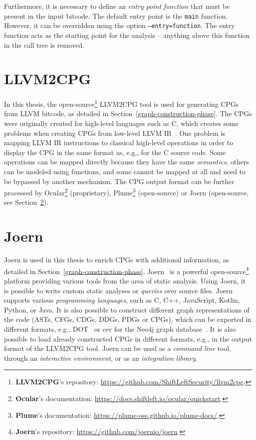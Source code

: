 Furthermore, it is necessary to define an \textit{entry point function} that must be present in the input bitcode. The default entry point is the \texttt{main} function. However, it can be overridden using the option \texttt{--entry=function}. The entry function acts as the starting point for the analysis -- anything above this function in the call tree is removed.


\section{LLVM2CPG}
\label{llvm2cpg}
In this thesis, the open-source\footnote{\textbf{LLVM2CPG}'s repository: \url{https://github.com/ShiftLeftSecurity/llvm2cpg}.} LLVM2CPG tool is used for generating CPGs from LLVM bitcode, as detailed in Section~\ref{graph-construction-phase}. The CPGs were originally created for high-level languages such as C, which creates some problems when creating CPGs from low-level LLVM IR~\cite{llvm2cpg-webpage}. One problem is mapping LLVM IR instructions to classical high-level operations in order to display the CPG in the same format as, e.g., for the C source code. Some operations can be mapped directly because they have the same \textit{semantics}, others can be modeled using functions, and some cannot be mapped at all and need to be bypassed by another mechanism. The CPG output format can be further processed by Ocular\footnote{\textbf{Ocular}'s documentation: \url{https://docs.shiftleft.io/ocular/quickstart}.} (proprietary), Plume\footnote{\textbf{Plume}'s documentation: \url{https://plume-oss.github.io/plume-docs/}.} (open-source) or Joern (open-source, see Section~\ref{joern}).


\section{Joern}
\label{joern}
Joern is used in this thesis to enrich CPGs with additional information, as detailed in Section~\ref{graph-construction-phase}. Joern~\cite{joern-website} is a powerful open-source\footnote{\textbf{Joern}'s repository: \url{https://github.com/joernio/joern}.} platform providing various tools from the area of static analysis. Using Joern, it is possible to write custom static analyses or \textit{queries} over source files. Joern supports various \textit{programming languages}, such as C, C++, JavaScript, Kotlin, Python, or Java. It is also possible to construct different graph representations of the code (ASTs, CFGs, CDGs, DDGs, PDGs or CPGs), which can be exported in different formats, e.g., DOT~\cite{DOT} or csv for the Neo4j graph database~\cite{neo4j-webpage}. It is also possible to load already constructed CPGs in different formats, e.g., in the output format of the LLVM2CPG tool. Joern can be used as a \textit{command line} tool, through an \textit{interactive environment}, or as an \textit{integration library}.

